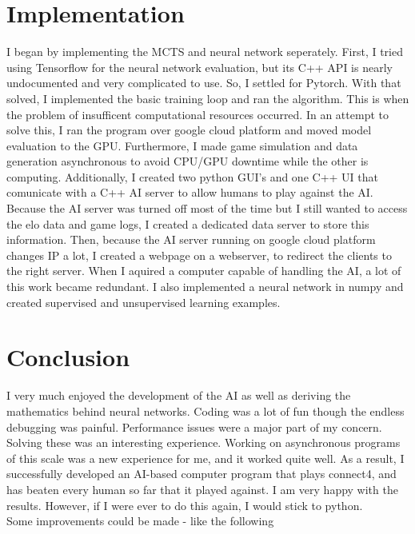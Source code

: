 \documentclass[12pt]{article}
\begin{document}
\section{Implementation}
I began by implementing the MCTS and neural network seperately. First, I tried using Tensorflow for the neural network evaluation, but its C++ API is nearly undocumented and very complicated to use. So, I settled for Pytorch. With that solved, I implemented the basic training loop and ran the algorithm. This is when the problem of insufficent computational resources occurred. In an attempt to solve this, I ran the program over google cloud platform and moved model evaluation to the GPU. Furthermore, I made game simulation and data generation asynchronous to avoid CPU/GPU downtime while the other is computing. Additionally, I created two python GUI's and one C++ UI that comunicate with a C++ AI server to allow humans to play against the AI. Because the AI server was turned off most of the time but I still wanted to access the elo data and game logs, I created a dedicated data server to store this information. Then, because the AI server running on google cloud platform changes IP a lot, I created a webpage on a webserver, to redirect the clients to the right server. When I aquired a computer capable of handling the AI, a lot of this work became redundant. I also implemented a neural network in numpy and created supervised and unsupervised learning examples.

\newpage
\section{Conclusion}
I very much enjoyed the development of the AI as well as deriving the mathematics behind neural networks. Coding was a lot of fun though the endless debugging was painful. Performance issues were a major part of my concern. Solving these was an interesting experience. Working on asynchronous programs of this scale was a new experience for me, and it worked quite well.
As a result, I successfully developed an AI-based computer program that plays connect4, and has beaten every human so far that it played against.
I am very happy with the results. However, if I were ever to do this again, I would stick to python.
\\
Some improvements could be made - like the following
\end{document}
